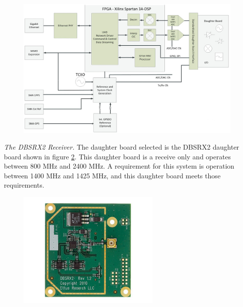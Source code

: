 {\begin{figure}[h!tb] 
\centering
\includegraphics[width=14cm]{Images/n200_block_edited}
\label{N200_block}
\end{figure}
}


\emph{The DBSRX2 Receiver.}  The daughter board selected is the DBSRX2 daughter board shown in figure \ref{dbsrx2}.  This daughter board is a receive only and operates between 800 MHz and 2400 MHz.  A requirement for this system is operation between 1400 MHz and 1425 MHz, and this daughter board meets those requirements.  

{\begin{figure}[h!tb] 
\centering
\includegraphics[width=7cm]{Images/dbsrx2.jpg}
\label{dbsrx2}
\end{figure}
}

